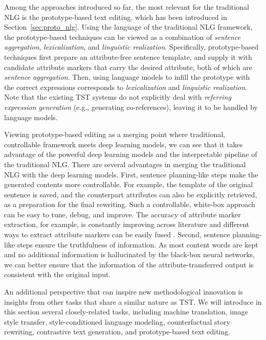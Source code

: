 Among the approaches introduced so far, the most relevant for the traditional NLG is the prototype-based text editing, which has been introduced in Section~\ref{sec:proto_nlg}.
Using the language of the traditional NLG framework, the prototype-based techniques can be viewed as a combination of \textit{sentence aggregation}, \textit{lexicalization}, and \textit{linguistic realization}.
Specifically, prototype-based techniques first prepare an attribute-free sentence template, and supply it with candidate attribute markers that carry the desired attribute, both of which are \textit{sentence aggregation}. Then, using language models to infill the prototype with the correct expressions corresponds to \textit{lexicalization} and \textit{linguistic realization}.
Note that the existing TST systems do not explicitly deal with \textit{referring expression generation} (e.g., generating co-references), leaving it to be handled by language models.

Viewing prototype-based editing as a merging point where traditional, controllable framework meets deep learning models, we can see that it takes advantage of the powerful deep learning models and the interpretable pipeline of the traditional NLG.
There are several advantages in merging the traditional NLG with the deep learning models. First, sentence planning-like steps make the generated contents more controllable. For example, the template of the original sentence is saved, and the counterpart attributes can also be explicitly retrieved, as a preparation for the final rewriting. Such a controllable, white-box approach can be easy to tune, debug, and improve. The accuracy of attribute marker extraction, for example, is constantly improving across literature  and different ways to extract attribute markers can be easily fused .
Second, sentence planning-like steps ensure the truthfulness of information. As most content words are kept and no additional information is hallucinated by the black-box neural networks, we can better ensure that the information of the attribute-transferred output is consistent with the original input.

\label{sec:related_tasks}
An additional perspective that can inspire new methodological innovation is insights from other tasks that share a similar nature as TST. We will introduce in this section several closely-related tasks, including machine translation, image style transfer, style-conditioned language modeling, counterfactual story rewriting, contrastive text generation, and prototype-based text editing.

